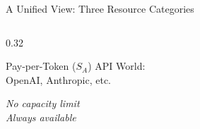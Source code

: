 \documentclass[aspectratio=169,10pt]{beamer}
\begin{document}
\begin{frame}{A Unified View: Three Resource Categories}
\begin{columns}[T]
\begin{column}{0.32\textwidth}
\begin{block}{Pay-per-Token ($S_A$)}
\footnotesize
\textcolor{icmlblue}{API World:}\\
OpenAI, Anthropic, etc.

\vspace{0.4cm}
\textit{No capacity limit}\\
\textit{Always available}
\end{block}
\end{column}
\end{columns}

\vspace{0.4cm}
\begin{center}
\end{center}
\end{frame}
\end{document}

